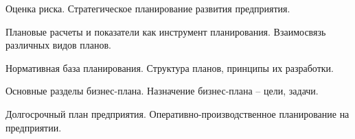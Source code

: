 \documentclass[
	14pt,
	a4paper,
	]
	{scrartcl}
\begin{document}
\vfill

\newpage


\shapk
{}
\setcounter{zad}{0}

\vfill
\z Оценка риска.
 \vfill
\z Стратегическое планирование развития предприятия.
 \vfill

\vfill

\newpage


\shapk
{}
\setcounter{zad}{0}

\vfill
\z Плановые расчеты и показатели как инструмент планирования.
 \vfill
\z Взаимосвязь различных видов планов.
 \vfill

\vfill

\newpage


\shapk
{}
\setcounter{zad}{0}

\vfill
\z Нормативная база планирования.
 \vfill
\z Структура планов, принципы их разработки.
 \vfill

\vfill

\newpage


\shapk
{}
\setcounter{zad}{0}

\vfill
\z Основные разделы бизнес-плана.
 \vfill
\z Назначение бизнес-плана – цели, задачи.
 \vfill

\vfill

\newpage


\shapk
{}
\setcounter{zad}{0}

\vfill
\z Долгосрочный план предприятия.
 \vfill
\z Оперативно-производственное планирование на предприятии.
 \vfill

\vfill

\newpage
\end{document}
